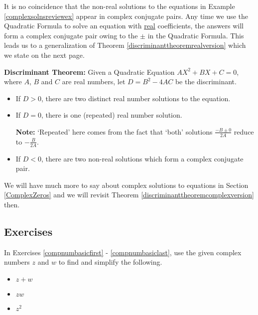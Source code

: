 \documentclass[10pt]{article}
\begin{document}
It is no coincidence that the non-real solutions to the equations in Example \ref{complexsolnsreviewex} appear in  complex conjugate pairs. Any time we use the Quadratic Formula to solve an equation with \underline{real} coefficients, the answers will form a  complex conjugate pair owing to the $\pm$ in the Quadratic Formula.  This leads us to a generalization of Theorem \ref{discriminanttheoremrealversion} which we state on the next page.

\colorbox{ResultColor}{\bbm
\begin{thm} \textbf{Discriminant Theorem:} \label{discriminanttheoremcomplexversion} Given a Quadratic Equation $AX^2 + BX + C = 0$, where $A$, $B$ and $C$ are real numbers, let $D = B^2 - 4AC$ be the discriminant.

\begin{itemize}

\item  If $D > 0$, there are two distinct real number solutions to the equation. 

\item  If $D = 0$, there is one (repeated) real number solution.  

\textbf{Note:}  `Repeated' here comes from the fact that `both' solutions $\frac{-B \pm 0}{2A}$ reduce to $-\frac{B}{2A}$.

\item  If $D < 0$, there are two non-real solutions which form a complex conjugate pair.

\end{itemize}

\end{thm}
\ebm}

\medskip

We will have much more to say about complex solutions to equations in Section \ref{ComplexZeros} and we will revisit Theorem \ref{discriminanttheoremcomplexversion} then.

\newpage

\subsection{Exercises}

In Exercises \ref{compnumbasicfirst} - \ref{compnumbasiclast}, use the given complex numbers $z$ and $w$ to find and simplify the following. 

\begin{multicols}{3}

\begin{itemize}

\item $z+w$
\item $zw$
\item $z^2$

\end{itemize}

\end{multicols}
\end{document}
